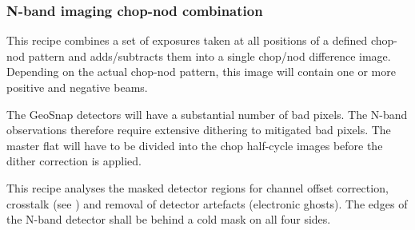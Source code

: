 
\subsubsection{N-band imaging chop-nod combination}
\label{img_n_chopnod}
\label{rec:img_n_chopnod}
\label{rec:metis_n_img_chopnod}
\label{sssec:img_n_chopnod}

This recipe combines a set of exposures taken at all positions of a
defined chop-nod pattern and adds/subtracts them into a single
chop/nod difference image. Depending on the actual chop-nod pattern,
this image will contain one or more positive and negative beams.

The GeoSnap detectors will have a substantial number of bad pixels.
The N-band observations therefore require extensive dithering to mitigated bad pixels.
The master flat will have to be divided into the chop half-cycle images before the dither correction is applied.

This recipe analyses the masked detector regions for channel offset correction, crosstalk (see \cite{matisse_minutes}) and removal of detector artefacts (electronic ghosts).
The edges of the N-band detector shall be behind a cold mask on all four sides.


